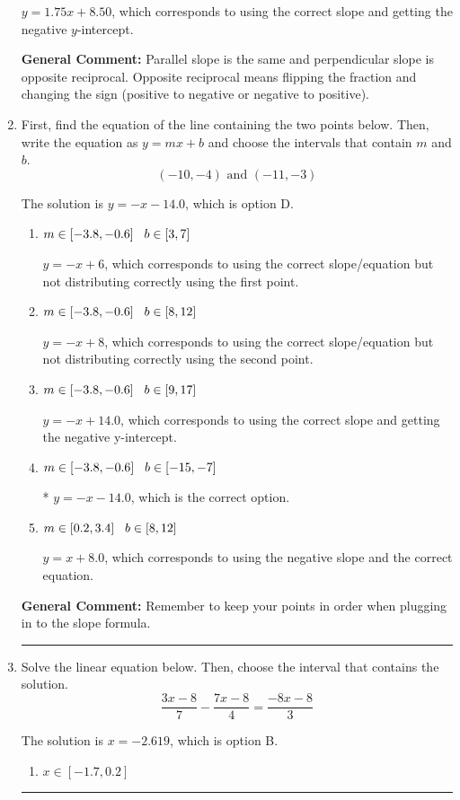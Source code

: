 \documentclass{extbook}[14pt]
\newcommand{\litem}[1]{\item #1

\rule{\textwidth}{0.4pt}}
\begin{document}
\begin{enumerate}
{\begin{enumerate}[label=\Alph*.]
 $y = 1.75x + 8.50$, which corresponds to using the correct slope and getting the negative $y$-intercept.
\end{enumerate}

\textbf{General Comment:} Parallel slope is the same and perpendicular slope is opposite reciprocal. Opposite reciprocal means flipping the fraction and changing the sign (positive to negative or negative to positive).
}
\litem{
First, find the equation of the line containing the two points below. Then, write the equation as $ y=mx+b $ and choose the intervals that contain $m$ and $b$.
\[ (-10, -4) \text{ and } (-11, -3) \]

The solution is \( y = -x -14.0 \), which is option D.\begin{enumerate}[label=\Alph*.]
\item \( m \in [-3.8, -0.6] \hspace*{3mm} b \in [3, 7] \)

 $y = -x + 6$, which corresponds to using the correct slope/equation but not distributing correctly using the first point.
\item \( m \in [-3.8, -0.6] \hspace*{3mm} b \in [8, 12] \)

 $y = -x + 8$, which corresponds to using the correct slope/equation but not distributing correctly using the second point.
\item \( m \in [-3.8, -0.6] \hspace*{3mm} b \in [9, 17] \)

 $y = -x + 14.0$, which corresponds to using the correct slope and getting the negative y-intercept.
\item \( m \in [-3.8, -0.6] \hspace*{3mm} b \in [-15, -7] \)

* $y = -x -14.0$, which is the correct option.
\item \( m \in [0.2, 3.4] \hspace*{3mm} b \in [8, 12] \)

 $y = x + 8.0$, which corresponds to using the negative slope and the correct equation.
\end{enumerate}

\textbf{General Comment:} Remember to keep your points in order when plugging in to the slope formula.
}
\litem{
Solve the linear equation below. Then, choose the interval that contains the solution.
\[ \frac{3x -8}{7} - \frac{7x -8}{4} = \frac{-8x -8}{3} \]

The solution is \( x = -2.619 \), which is option B.\begin{enumerate}[label=\Alph*.]
\item \( x \in [-1.7, 0.2] \)


\end{enumerate}}
\end{enumerate}
\end{document}
